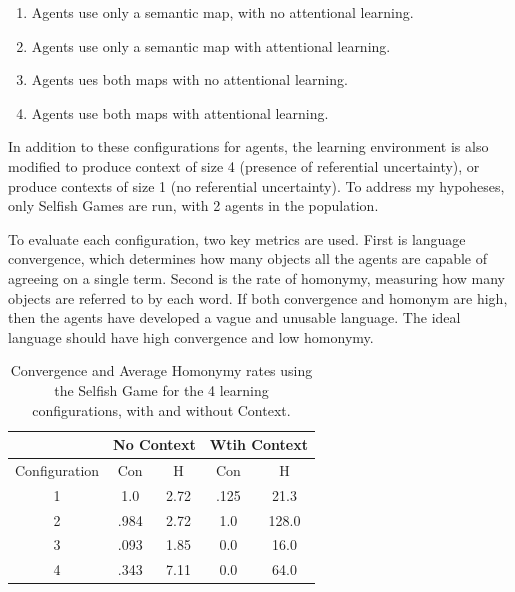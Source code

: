 \documentclass[a4paper,11pt]{article}
\begin{document}
{\small
\begin{enumerate}

\item Agents use only a semantic map, with no attentional learning.

\item Agents use only a semantic map with attentional learning.

\item Agents ues both maps with no attentional learning.

\item Agents use both maps with attentional learning.

\end{enumerate}
}

In addition to these configurations for agents, the learning environment is also
modified to produce context of size 4 (presence of referential uncertainty), or
produce contexts of size 1 (no referential uncertainty).  To address my
hypoheses, only Selfish Games are run, with 2 agents in the population.

To evaluate each configuration, two key metrics are used.  First is language
convergence, which determines how many objects all the agents are capable of
agreeing on a single term.  Second is the rate of homonymy, measuring how many
objects are referred to by each word.  If both convergence and homonym are high,
then the agents have developed a vague and unusable language.  The ideal
language should have high convergence and low homonymy.  

\begin{center}
\begin{table}
\begin{tabular}[ht]{ | c | c | c | c | c |}
\hline
 & \multicolumn{2}{|c|}{No Context} & \multicolumn{2}{|c|}{Wtih Context} \\
 \hline
 Configuration & Con & H& Con & H \\
 \hline
 1 & 1.0 & 2.72 & .125 & 21.3 \\
 2 & .984 & 2.72 & 1.0 & 128.0 \\
 3 & .093 & 1.85 & 0.0 & 16.0 \\
 4 & .343 & 7.11 & 0.0 & 64.0 \\
 \hline
\end{tabular}
\caption{Convergence and Average Homonymy rates using the Selfish Game  for the 4 learning
configurations, with and without Context.}  
\label{tb:game-result}
\end{table}
\end{center}
\end{document}
